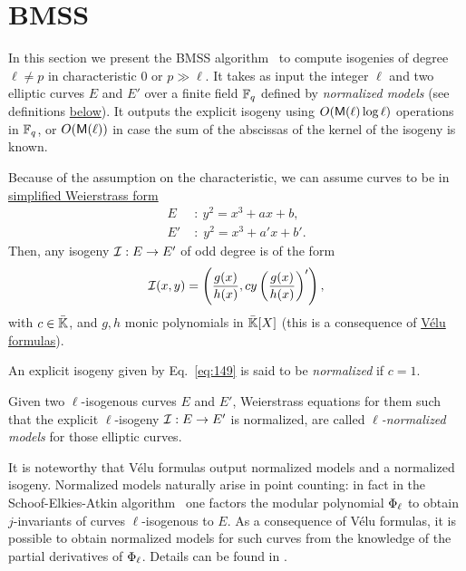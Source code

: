 \section{BMSS}
\label{sec:bmss}
In this section we present the BMSS
algorithm~\cite{bostan+morain+salvy+schost08} to compute isogenies of
degree $\ell\ne p$ in characteristic $0$ or $p\gg\ell$. It takes as
input the integer $\ell$ and two elliptic curves $E$ and $E'$ over a
finite field $\mathbb{F}_q$ defined by \emph{normalized models} (see
definitions \hyperref[def:canon-isog]{below}). It outputs the explicit
isogeny using $O(\mathsf{M}(\ell)\log\ell)$ operations in $\mathbb{F}_q$, or
$O(\mathsf{M}(\ell))$ in case the sum of the abscissas of the kernel of the
isogeny is known.

Because of the assumption on the characteristic, we can assume curves
to be in \hyperref[th:simplified-weierstrass]{simplified Weierstrass
  form}
\begin{equation}
  \label{eq:140}
  \begin{aligned}
    E \;&:\: y^2 = x^3 + ax + b\text{,}\\
    E'\;&:\; y^2 = x^3 + a'x + b'\text{.}
  \end{aligned}
\end{equation}
Then, any isogeny $\mathcal{I}:E\rightarrow E'$ of odd degree is of the form
\begin{equation}
  \label{eq:149}
  \mathcal{I}(x,y) = \left(\frac{g(x)}{h(x)},cy\left(\frac{g(x)}{h(x)}\right)'\right)
  \text{,}
\end{equation}
with $c\in\bar{\mathbb{K}}$, and $g,h$ monic polynomials in $\bar{\mathbb{K}}[X]$
(this is a consequence of \hyperref[eq:159]{Vélu formulas}).

\begin{definition}
  \label{def:canon-isog}
  An explicit isogeny given by Eq.~\eqref{eq:149} is said to be
  \emph{normalized}
  if $c=1$. 

  Given two $\ell$-isogenous curves $E$ and $E'$, Weierstrass
  equations for them such that the explicit $\ell$-isogeny
  $\mathcal{I}:E\rightarrow E'$ is normalized, are called
  \emph{$\ell$-normalized models} for those
  elliptic curves.
\end{definition}

 It
is noteworthy that Vélu formulas output normalized models and a
normalized isogeny. Normalized models naturally arise in point
counting: in fact in the Schoof-Elkies-Atkin
algorithm~\cite{atkin88,elkies98,schoof95} one factors the modular
polynomial $\Phi_\ell$ to obtain $j$-invariants of curves
$\ell$-isogenous to $E$. As a consequence of Vélu formulas, it is
possible to obtain normalized models for such curves from the
knowledge of the partial derivatives of $\Phi_\ell$.  Details can
be found in \cite{schoof95,morain95,elkies98,lercier-algorithmique}.

